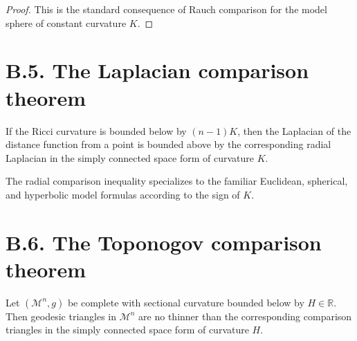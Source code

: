 \begin{proof}
\sketch This is the standard consequence of Rauch comparison for the model sphere of constant curvature $K$.
\end{proof}

\section*{B.5. The Laplacian comparison theorem}

\begin{theorem}
\label{appb-thm-laplacian-comparison}


If the Ricci curvature is bounded below by $(n-1)K$, then the Laplacian of the distance function from a point is bounded above by the corresponding radial Laplacian in the simply connected space form of curvature $K$.
\end{theorem}

\begin{corollary}
\label{appb-cor-model-space-radial-comparison}


The radial comparison inequality specializes to the familiar Euclidean, spherical, and hyperbolic model formulas according to the sign of $K$.
\end{corollary}

\section*{B.6. The Toponogov comparison theorem}

\begin{theorem}
\label{appb-thm-toponogov-comparison}


Let $(\mathcal M^n,g)$ be complete with sectional curvature bounded below by $H\in\mathbb R$. Then geodesic triangles in $\mathcal M^n$ are no thinner than the corresponding comparison triangles in the simply connected space form of curvature $H$.
\end{theorem}

